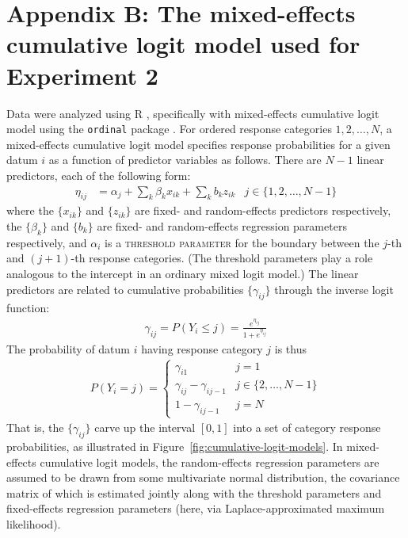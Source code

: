 \clearpage
\section*{Appendix B: The mixed-effects cumulative logit model used for Experiment 2}
Data were analyzed using R \citep{RCT2014}, specifically with mixed-effects cumulative logit model using the \texttt{ordinal} package \citep{Christensen2015}.  For ordered response categories $1, 2, \dots, N$, a mixed-effects cumulative logit model specifies response probabilities for a given datum $i$ as a function of predictor variables as follows.  There are $N-1$ linear predictors, each of the following form:
%
\begin{align*}
  \eta_{ij} & = \alpha_j + \sum_{k} \beta_k x_{ik} + \sum_{k} b_k z_{ik} & j \in \{1, 2, \dots, N-1\}
\end{align*}
%
where the $\{x_{ik}\}$ and $\{z_{ik}\}$ are fixed- and random-effects predictors respectively,  the $\{\beta_k\}$ and $\{b_k\}$ are fixed- and random-effects regression parameters respectively, and $\alpha_i$ is a \textsc{threshold parameter} for the boundary between the $j$-th and $(j+1)$-th response categories.  (The threshold parameters play a role analogous to the intercept in an ordinary mixed logit model.)  The linear predictors are related to cumulative probabilities $\{\gamma_{ij}\}$ through the inverse logit function:
%
\begin{align*}
  \gamma_{ij} = P(Y_i \leq j) = \frac{e^{\eta_{ij}}}{1+e^{\eta_{ij}}}
\end{align*}
%
The probability of datum $i$ having response category $j$ is thus
%
\begin{align*}
  P(Y_i = j) =
  \begin{cases}
    \gamma_{i1} & j=1\\
    \gamma_{ij} - \gamma_{ij-1} & j \in \{2, \dots, N-1\}\\
1-\gamma_{ij-1} & j=N
  \end{cases}
\end{align*}
%
That is, the $\{\gamma_{ij}\}$ carve up the interval $[0,1]$ into a set of category response probabilities, as illustrated in Figure~\ref{fig:cumulative-logit-models}.  In mixed-effects cumulative logit models, the random-effects regression parameters are assumed to be drawn from some multivariate normal distribution, the covariance matrix of which is estimated jointly along with  the threshold parameters and fixed-effects regression parameters (here, via Laplace-approximated maximum likelihood).

